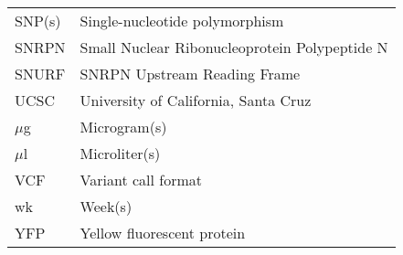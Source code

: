 \begin{longtabu}{ll}
  SNP(s) & Single-nucleotide polymorphism\\
  SNRPN  & Small Nuclear Ribonucleoprotein Polypeptide N\\
  SNURF  & SNRPN Upstream Reading Frame\\
  UCSC   & University of California, Santa Cruz\\
  $\mu$g & Microgram(s)\\
  $\mu$l & Microliter(s)\\
  VCF    & Variant call format\\
  wk     & Week(s)\\
  YFP    & Yellow fluorescent protein\\
\end{longtabu}

\vspace{2em}

\pagebreak{}
